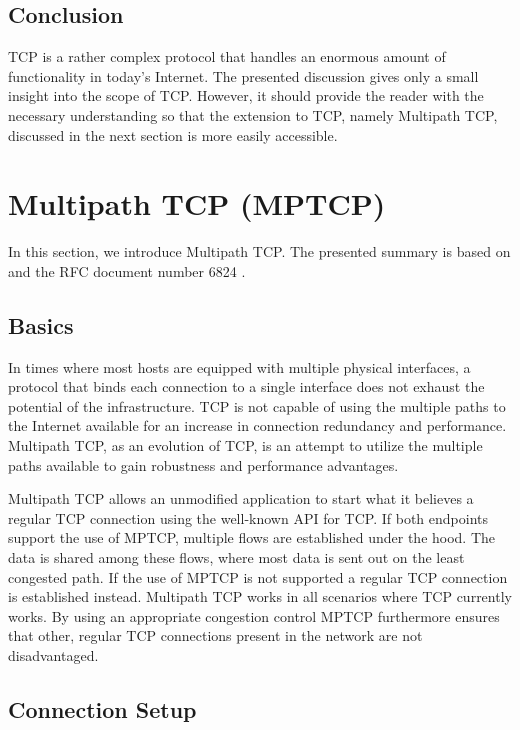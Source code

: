 \subsection*{Conclusion}

TCP is a rather complex protocol that handles an enormous amount of functionality in today's Internet. The presented discussion gives only a small insight into the scope of TCP. However, it should provide the reader with the necessary understanding so that the extension to TCP, namely Multipath TCP, discussed in the next section is more easily accessible.

\section{Multipath TCP (MPTCP)}
\label{sec:MPTCP}

In this section, we introduce Multipath TCP. The presented summary is based on \cite{Barre2011, Raiciu2012, Wischik2011} and the RFC document number 6824 \cite{rfc6824}.

\subsection*{Basics}

In times where most hosts are equipped with multiple physical interfaces, a protocol that binds each connection to a single interface does not exhaust the potential of the infrastructure. TCP is not capable of using the multiple paths to the Internet available for an increase in connection redundancy and performance. Multipath TCP, as an evolution of TCP, is an attempt to utilize the multiple paths available to gain robustness and performance advantages.

Multipath TCP allows an unmodified application to start what it believes a regular TCP connection using the well-known API for TCP. If both endpoints support the use of MPTCP, multiple flows are established under the hood. The data is shared among these flows, where most data is sent out on the least congested path. If the use of MPTCP is not supported a regular TCP connection is established instead. Multipath TCP works in all scenarios where TCP currently works. By using an appropriate congestion control MPTCP furthermore ensures that other, regular TCP connections present in the network are not disadvantaged. 

\subsection*{Connection Setup}

